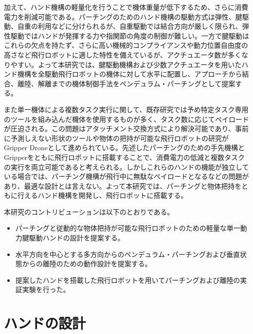 \documentclass{jarticle}
\begin{document}
加えて、ハンド機構の軽量化を行うことで機体重量が低下するため、さらに消費電力を削減可能である。パーチングのためのハンド機構の駆動方式は弾性、腱駆動、自重の利用などに分けられるが、自重駆動では結合方向が厳しく限られ、弾性駆動ではハンドが発揮する力や指関節の角度の制御が難しい。一方で腱駆動はこれらの欠点を持たず、さらに高い機械的コンプライアンスや動力位置自由度の高さなど飛行ロボットに適した特性を備えているが、アクチュエータ数が多くなりやすい。よって本研究では、腱駆動機構および少数アクチュエータを用いたハンド機構を全駆動飛行ロボットの機体に対して水平に配置し、アプローチから結合、離陸、解離までの機体制御手法をペンデュラム・パーチングとして提案する。

また単一機体による複数タスク実行に関して、既存研究では予め特定タスク専用のツールを組み込んだ機体を使用するものが多く、タスク数に応じてペイロードが圧迫される。この問題はアタッチメント交換方式により解決可能であり、事前に予測しえない形状のツールや物体の把持が可能な飛行ロボットの研究がGripper Droneとして進められている。先述したパーチングのための手先機構とGripperをともに飛行ロボットに搭載することで、消費電力の低減と複数タスクの実行を両立可能であると考えられる。しかしこれらのハンドの機能が独立している場合では、パーチング機構が飛行中に無駄なペイロードとなるなどの問題があり、最適な設計とは言えない。よって本研究では、パーチングと物体把持をともに行えるハンド機構を開発し、飛行ロボットに搭載する。

本研究のコントリビューションは以下のとおりである。

\begin{itemize}
  \item パーチングと従動的な物体把持が可能な飛行ロボットのための軽量な単一動力腱駆動ハンドの設計を提案する。
  \item 水平方向を中心とする多方向からのペンデュラム・パーチングおよび垂直状態からの離陸のための動作設計を提案する。
  \item 提案したハンドを搭載した飛行ロボットを用いてパーチングおよび離陸の実証実験を行った。
\end{itemize}

\section{ハンドの設計}
\end{document}
